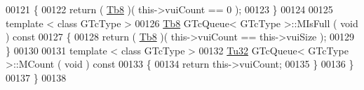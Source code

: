 \begin{DoxyCode}
00121 \textcolor{keyword}{      }\{
00122          \textcolor{keywordflow}{return} ( \mbox{\hyperlink{namespace_g_n_common_a8115dc7ed53b6e5b52e6bfde1632ea74}{Tb8}} )( this->vuiCount == 0 );
00123       \}
00124 
00125       \textcolor{keyword}{template} < \textcolor{keyword}{class} GTcType >
00126       \mbox{\hyperlink{namespace_g_n_common_a8115dc7ed53b6e5b52e6bfde1632ea74}{Tb8}} GTcQueue< GTcType >::MIsFull  ( \textcolor{keywordtype}{void} )\textcolor{keyword}{ const}
00127 \textcolor{keyword}{      }\{
00128          \textcolor{keywordflow}{return} ( \mbox{\hyperlink{namespace_g_n_common_a8115dc7ed53b6e5b52e6bfde1632ea74}{Tb8}} )( this->vuiCount == this->vuiSize );
00129       \}
00130 
00131       \textcolor{keyword}{template} < \textcolor{keyword}{class} GTcType >
00132       \mbox{\hyperlink{namespace_g_n_common_a941b527ef318f318aed7903dc832b7e4}{Tu32}} GTcQueue< GTcType >::MCount ( \textcolor{keywordtype}{void} )\textcolor{keyword}{ const}
00133 \textcolor{keyword}{      }\{
00134          \textcolor{keywordflow}{return} this->vuiCount;
00135       \}
00136    \}
00137 \}
00138 
\end{DoxyCode}

